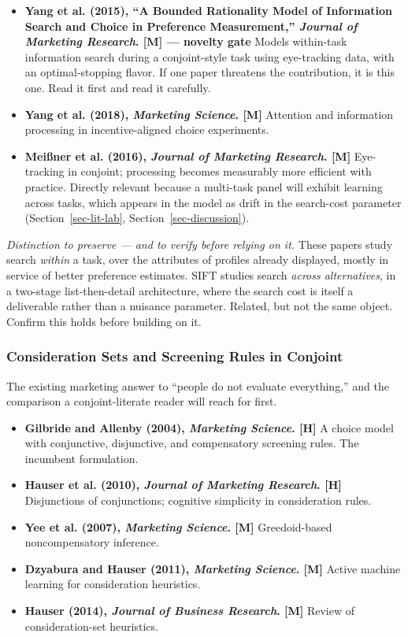 \documentclass[
  letterpaper,
  DIV=11,
  numbers=noendperiod]{scrartcl}
\providecommand{\tightlist}{%
  \setlength{\itemsep}{0pt}\setlength{\parskip}{0pt}}
\begin{document}
\begin{itemize}
\tightlist
\item
  \textbf{Yang et al. (2015), ``A Bounded Rationality Model of
  Information Search and Choice in Preference Measurement,''
  \emph{Journal of Marketing Research}. {[}M{]} --- novelty gate} Models
  within-task information search during a conjoint-style task using
  eye-tracking data, with an optimal-stopping flavor. If one paper
  threatens the contribution, it is this one. Read it first and read it
  carefully.
\item
  \textbf{Yang et al. (2018), \emph{Marketing Science}. {[}M{]}}
  Attention and information processing in incentive-aligned choice
  experiments.
\item
  \textbf{Meißner et al. (2016), \emph{Journal of Marketing Research}.
  {[}M{]}} Eye-tracking in conjoint; processing becomes measurably more
  efficient with practice. Directly relevant because a multi-task panel
  will exhibit learning across tasks, which appears in the model as
  drift in the search-cost parameter (Section~\ref{sec-lit-lab},
  Section~\ref{sec-discussion}).
\end{itemize}

\emph{Distinction to preserve --- and to verify before relying on it.}
These papers study search \emph{within} a task, over the attributes of
profiles already displayed, mostly in service of better preference
estimates. SIFT studies search \emph{across alternatives}, in a
two-stage list-then-detail architecture, where the search cost is itself
a deliverable rather than a nuisance parameter. Related, but not the
same object. Confirm this holds before building on it.

\subsubsection{Consideration Sets and Screening Rules in
Conjoint}\label{sec-applit-consideration}

The existing marketing answer to ``people do not evaluate everything,''
and the comparison a conjoint-literate reader will reach for first.

\begin{itemize}
\tightlist
\item
  \textbf{Gilbride and Allenby (2004), \emph{Marketing Science}.
  {[}H{]}} A choice model with conjunctive, disjunctive, and
  compensatory screening rules. The incumbent formulation.
\item
  \textbf{Hauser et al. (2010), \emph{Journal of Marketing Research}.
  {[}H{]}} Disjunctions of conjunctions; cognitive simplicity in
  consideration rules.
\item
  \textbf{Yee et al. (2007), \emph{Marketing Science}. {[}M{]}}
  Greedoid-based noncompensatory inference.
\item
  \textbf{Dzyabura and Hauser (2011), \emph{Marketing Science}. {[}M{]}}
  Active machine learning for consideration heuristics.
\item
  \textbf{Hauser (2014), \emph{Journal of Business Research}. {[}M{]}}
  Review of consideration-set heuristics.
\end{itemize}
\end{document}
